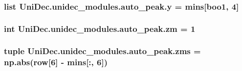 \subsubsection[{y}]{\setlength{\rightskip}{0pt plus 5cm}list Uni\+Dec.\+unidec\+\_\+modules.\+auto\+\_\+peak.\+y = {\bf mins}\mbox{[}{\bf boo1}, 4\mbox{]}}\label{namespace_uni_dec_1_1unidec__modules_1_1auto__peak_a0ba2e98c339056b40fbed6c28f680c68}
\hypertarget{namespace_uni_dec_1_1unidec__modules_1_1auto__peak_aec6037c920102c5579f10f9223895812}{}
\subsubsection[{zm}]{\setlength{\rightskip}{0pt plus 5cm}int Uni\+Dec.\+unidec\+\_\+modules.\+auto\+\_\+peak.\+zm = 1}\label{namespace_uni_dec_1_1unidec__modules_1_1auto__peak_aec6037c920102c5579f10f9223895812}
\hypertarget{namespace_uni_dec_1_1unidec__modules_1_1auto__peak_a34ea9485406d53f96e5c08b45eaaaa3e}{}
\subsubsection[{zms}]{\setlength{\rightskip}{0pt plus 5cm}tuple Uni\+Dec.\+unidec\+\_\+modules.\+auto\+\_\+peak.\+zms = np.\+abs({\bf row}\mbox{[}6\mbox{]} -\/ {\bf mins}\mbox{[}\+:, 6\mbox{]})}\label{namespace_uni_dec_1_1unidec__modules_1_1auto__peak_a34ea9485406d53f96e5c08b45eaaaa3e}
